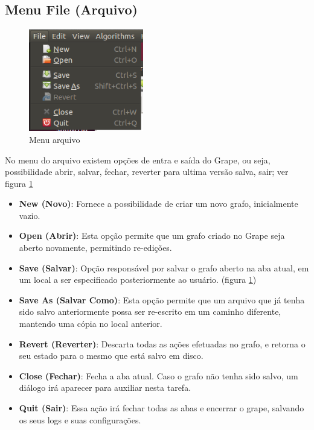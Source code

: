 \documentclass[a4paper]{abnt}
\begin{document}
\subsection{Menu File (Arquivo)}
\begin{figure}[htb]
    \centering
	\includegraphics[width=5cm]{grape_menu_file.png}
	\caption{Menu arquivo}
	\label{img_grape_menu_file}
\end{figure}

No menu do arquivo existem opções de entra e saída do Grape, ou seja, possibilidade abrir, salvar, fechar, reverter para ultima versão salva, sair; ver figura \ref{img_grape_menu_file}
\begin{itemize}
    \item \textbf{New (Novo)}: Fornece a possibilidade de criar um novo grafo, inicialmente vazio.
    \item \textbf{Open (Abrir)}: Esta opção permite que um grafo criado no Grape seja aberto novamente, permitindo re-edições.
    \item \textbf{Save (Salvar)}: Opção responsável por salvar o grafo aberto na aba atual, em um local a ser especificado posteriormente ao usuário. (figura \ref{img_grape_menu_file})
    \item \textbf{Save As (Salvar Como)}: Esta opção permite que um arquivo que já tenha sido salvo anteriormente possa ser re-escrito em um caminho diferente, mantendo uma cópia no local anterior.
    \item \textbf{Revert (Reverter)}: Descarta todas as ações efetuadas no grafo, e retorna o seu estado para o mesmo que está salvo em disco.
    \item \textbf{Close (Fechar)}: Fecha a aba atual. Caso o grafo não tenha sido salvo, um diálogo irá aparecer para auxiliar nesta tarefa.
    \item \textbf{Quit (Sair)}: Essa ação irá fechar todas as abas e encerrar o grape, salvando os seus logs e suas configurações.
\end{itemize}
\end{document}
